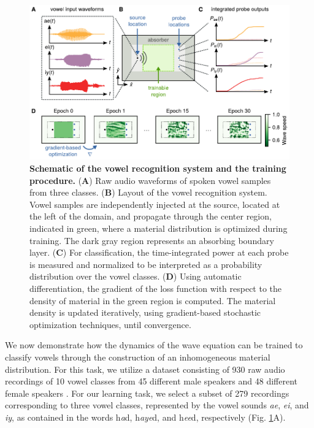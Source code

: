 \begin{figure}
  \centering
  \includegraphics{figures/insitu_RNN_train}
  \caption{
  \textbf{Schematic of the vowel recognition system and the training procedure.}
  (\textbf{A})
  Raw audio waveforms of spoken vowel samples from three classes.
  (\textbf{B})
  Layout of the vowel recognition system. Vowel samples are independently injected at the source, located at the left of the domain, and propagate through the center region, indicated in green, where a material distribution is optimized during training. The dark gray region represents an absorbing boundary layer.
  (\textbf{C})
  For classification, the time-integrated power at each probe is measured and normalized to be interpreted as a probability distribution over the vowel classes.
  (\textbf{D})
  Using automatic differentiation, the gradient of the loss function with respect to the density of material in the green region is computed. The material density is updated iteratively, using gradient-based stochastic optimization techniques, until convergence.
  }
  \label{fig:train}
\end{figure}

We now demonstrate how the dynamics of the wave equation can be trained to classify vowels through the construction of an inhomogeneous material distribution. 
For this task, we utilize a dataset consisting of 930 raw audio recordings of 10 vowel classes from 45 different male speakers and 48 different female speakers \cite{hillenbrand_acoustic_1995}. 
For our learning task, we select a subset of 279 recordings corresponding to three vowel classes, represented by the vowel sounds \textit{ae}, \textit{ei}, and \textit{iy}, as contained in the words h\textit{a}d, h\textit{aye}d, and h\textit{ee}d, respectively (Fig. \ref{fig:train}A).


